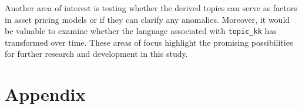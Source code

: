 \documentclass[12pt, letterpaper]{article}
\begin{document}
Another area of interest is testing whether the derived topics can serve as factors in asset pricing models or if they can clarify any anomalies. Moreover, it would be valuable to examine whether the language associated with \texttt{topic\_kk} has transformed over time. These areas of focus highlight the promising possibilities for further research and development in this study.

%
%
%
%
%



\section*{Appendix}
\end{document}
